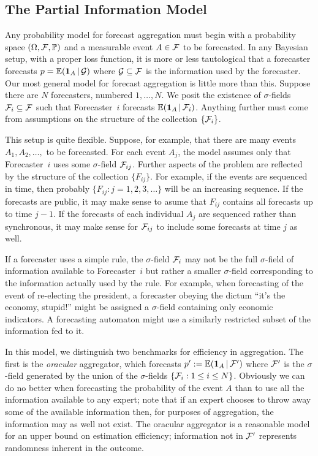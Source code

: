 \documentclass[11pt]{article}
\renewcommand{\P}{\mathbb{P}}
\newcommand{\E}{\mathbb{E}}
\theoremstyle{definition}
\theoremstyle{definition}
\def\one{{\bf 1}}
\def\F{{\cal F}}
\def\G{{\cal G}}
\def\P{{\mathbb P}}
\def\E{{\mathbb E}}
\def\|{\, | \,}
\begin{document}
\subsection{The Partial Information Model}

Any probability model for forecast aggregation must begin with a 
probability space $(\Omega, \F , \P)$ and a measurable event
$A \in \F$ to be forecasted.  In any Bayesian setup, with a proper 
loss function, it is more or less tautological that a forecaster
forecasts $p = \E (\one_A \| \G)$ where $\G \subseteq \F$ is the
information used by the forecaster.  Our most general model for
forecast aggregation is little more than this.  Suppose there are
$N$ forecasters, numbered $1, \ldots, N$.  We posit the existence
of $\sigma$-fields $\F_i \subseteq \F$ such that Forecaster~$i$
forecasts $\E (\one_A \| \F_i)$.  Anything further must come from
assumptions on the structure of the collection $\{ \F_i \}$.

This setup is quite flexible.  Suppose, for example, that there are
many events $A_1, A_2 , \ldots,$ to be forecasted.  For each event 
$A_j$, the model assumes only that Forecaster~$i$ uses some 
$\sigma$-field $\F_{ij}$.  Further aspects of the problem are
reflected by the structure of the collection $\{ F_{ij} \}$.
For example, if the events are sequenced in time, then probably
$\{ F_{ij} : j = 1 , 2, 3, \ldots \}$ will be an increasing 
sequence.  If the forecasts are public, it may make sense to 
asume that $F_{ij}$ contains all forecasts up to time $j-1$.
If the forecasts of each individual $A_j$ are sequenced rather 
than synchronous, it may make sense for $\F_{ij}$ to include
some forecasts at time $j$ as well.  

If a forecaster uses a simple rule, the $\sigma$-field $\F_i$ may 
not be the full $\sigma$-field of information available to 
Forecaster~$i$ but rather a smaller $\sigma$-field corresponding
to the information actually used by the rule.  For example, 
when forecasting of the event of re-electing the president,
a forecaster obeying the dictum ``it's the economy, stupid!''
might be assigned a $\sigma$-field containing only economic indicators.
A forecasting automaton might use a similarly restricted subset
of the information fed to it.

In this model, we distinguish two benchmarks for efficiency in
aggregation.  The first is the {\em oracular} aggregator, which
forecasts $p' := \E (\one_A \| \F')$ where $\F'$ is the $\sigma$-field
generated by the union of the $\sigma$-fields $\{ \F_i : 1 \leq i 
\leq N \}$.  Obviously we can do no better when forecasting the
probability of the event $A$ than to use all the information available 
to any expert; note that if an expert chooses to throw away 
some of the available information then, for purposes of aggregation,
the information may as well not exist.  The oracular aggregator
is a reasonable model for an upper bound on estimation efficiency;
information not in $\F'$ represents randomness inherent in the outcome.
\end{document}
